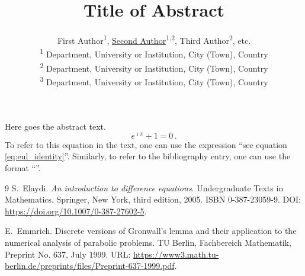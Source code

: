 \documentclass[a4paper,12pt]{article}
\title{Title of Abstract}
\author{First Author\textsuperscript{1}, \underline{Second Author}\textsuperscript{1,2}, Third Author\textsuperscript{2}, etc. \\
    \footnotesize \textsuperscript{1} Department, University or Institution, City (Town), Country \\
    \footnotesize \textsuperscript{2} Department, University or Institution, City (Town), Country \\
    \footnotesize \textsuperscript{3} Department, University or Institution, City (Town), Country
}
\date{}
\begin{document}
\maketitle

Here goes the abstract text.
\begin{equation}\label{eq:eul_identity}
    {e}^{\imath \pi} + 1 = 0\,.
\end{equation}
To refer to this equation in the text, one can use the expression ``see equation \eqref{eq:eul_identity}''. Similarly, to refer to the bibliography entry, one can use the format ``\cite{BookDiffElaydi2005,emmrich1999}''.

\begin{thebibliography}{9}
    S.~Elaydi.
    \newblock \emph{An introduction to difference equations}.
    \newblock Undergraduate Texts in Mathematics. Springer, New York, third 
    edition, 2005.
    \newblock ISBN 0-387-23059-9.
    \newblock DOI: \url{https://doi.org/10.1007/0-387-27602-5}.

    E.~Emmrich.
    \newblock Discrete versions of {G}ronwall's lemma and their application to the 
    numerical analysis of parabolic problems.
    \newblock TU Berlin, Fachbereich Mathematik, Preprint No. 637, July 1999.
    \newblock URL: \url{https://www3.math.tu-berlin.de/preprints/files/Preprint-637-1999.pdf}.
\end{thebibliography}
\end{document}
